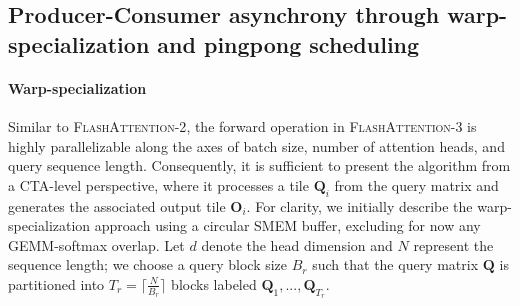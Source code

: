 \begin{enumerate}
\subsection{Producer-Consumer asynchrony through warp-specialization and pingpong scheduling}
\label{sec:algo_ws}

\paragraph{Warp-specialization}
Similar to \textsc{FlashAttention-2}, the forward operation in \textsc{FlashAttention-3} is highly parallelizable along the axes of batch size, number of attention heads, and query sequence length. Consequently, it is sufficient to present the algorithm from a CTA-level perspective, where it processes a tile $\mathbf{Q}_i$ from the query matrix and generates the associated output tile $\mathbf{O}_i$. For clarity, we initially describe the warp-specialization approach using a circular SMEM buffer, excluding for now any GEMM-softmax overlap. Let $d$ denote the head dimension and $N$ represent the sequence length; we choose a query block size $B_r$ such that the query matrix $\mathbf{Q}$ is partitioned into $T_r = \lceil \frac{N}{B_r} \rceil$ blocks labeled $\mathbf{Q}_1, ..., \mathbf{Q}_{T_r}$.


\end{enumerate}
